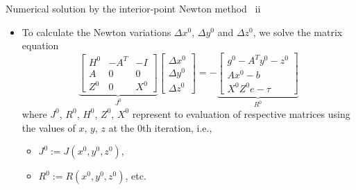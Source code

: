 %
\begin{frame}{Numerical solution by the interior-point Newton method \, ii}
\begin{itemize}
\item To calculate the Newton variations ${\Delta x^{0}}$,
${\Delta y^{0}}$
and ${\Delta z^{0}}$,
we solve the matrix equation\\[5pt] 
%
\[
\underset{J^{0}}{\underbrace{\begin{bmatrix}H^{0} & -A^{T} & -I\\
A & 0 & 0\\
Z^{0} & 0 & X^{0}
\end{bmatrix}}}\begin{bmatrix}\Delta x^{0}\\
\Delta y^{0}\\
\Delta z^{0}
\end{bmatrix}=-\underset{R^{0}}{\underbrace{\begin{bmatrix}g^{0}-A^{T}y^{0}-z^{0}\\
Ax^{0}-b\\
X^{0}Z^{0}e-\tau
\end{bmatrix}}}
\]
%
where $J^{0}$, $R^{0}$, $H^{0}$, $Z^{0}$, $X^{0}$ represent to evaluation of respective matrices using the values of $x$, $y$, $z$ at the 0th iteration, i.e., 
\begin{itemize}
	\item $J^{0} := J(x^0, y^0, z^0)$, 
	\item $R^{0} := R(x^0, y^0, z^0)$, etc.
\end{itemize}
%
\end{itemize}
\end{frame}
%
%
